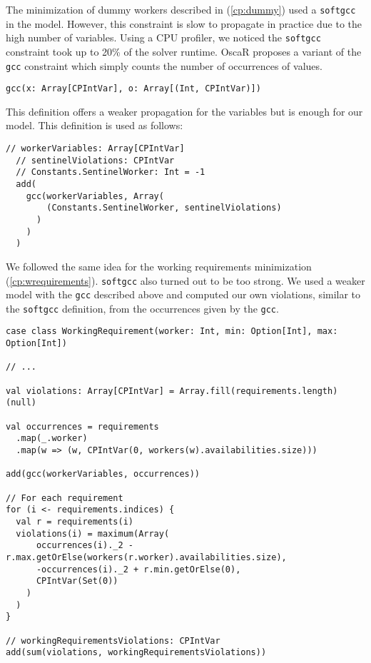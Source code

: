 \documentclass[../thesis.tex]{subfiles}
\begin{document}
The minimization of dummy workers described in (\ref{cp:dummy}) used a \texttt{softgcc} in the model.
However, this constraint is slow to propagate in practice due to the high number of variables.
Using a CPU profiler, we noticed the \texttt{softgcc} constraint took up to 20\% of the solver runtime. 
OscaR proposes a variant of the \texttt{gcc} constraint which simply counts the number of occurrences of values.


\begin{lstlisting}[style=scalaStyle,label={gcc_oscar},caption={Variant of \texttt{gcc} implemented in OscaR},captionpos=b]
gcc(x: Array[CPIntVar], o: Array[(Int, CPIntVar)])
\end{lstlisting}

This definition offers a weaker propagation for the variables but is enough for our model. 
This definition is used as follows:


\begin{lstlisting}[style=scalaStyle,label={gcc_oscar_2},caption={Usage of \texttt{gcc} to count dummy workers},captionpos=b]
  // workerVariables: Array[CPIntVar]
  // sentinelViolations: CPIntVar
  // Constants.SentinelWorker: Int = -1
  add(
    gcc(workerVariables, Array(
        (Constants.SentinelWorker, sentinelViolations)
      )
    )
  )
\end{lstlisting}

We followed the same idea for the working requirements minimization (\ref{cp:wrequirements}). \texttt{softgcc} also turned out to be too strong.
We used a weaker model with the \texttt{gcc} described above and computed our own violations, similar to the \texttt{softgcc} definition,
from the occurrences given by the \texttt{gcc}.


\begin{lstlisting}[style=scalaStyle,label={gcc_oscar_2},caption={Usage of \texttt{gcc} to count working requirements violations},captionpos=b]
case class WorkingRequirement(worker: Int, min: Option[Int], max: Option[Int])

// ...

val violations: Array[CPIntVar] = Array.fill(requirements.length)(null)

val occurrences = requirements
  .map(_.worker)
  .map(w => (w, CPIntVar(0, workers(w).availabilities.size)))

add(gcc(workerVariables, occurrences))

// For each requirement 
for (i <- requirements.indices) {
  val r = requirements(i)
  violations(i) = maximum(Array(
      occurrences(i)._2 - r.max.getOrElse(workers(r.worker).availabilities.size),
      -occurrences(i)._2 + r.min.getOrElse(0),
      CPIntVar(Set(0))
    )
  )
}

// workingRequirementsViolations: CPIntVar
add(sum(violations, workingRequirementsViolations))
\end{lstlisting}
\end{document}
